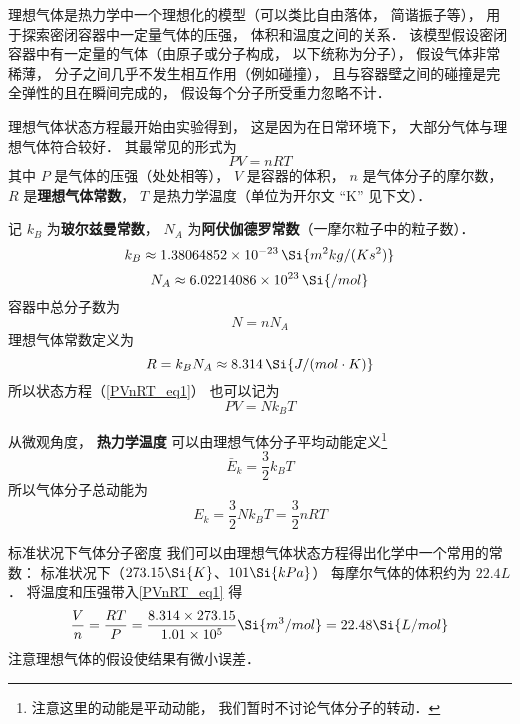 

理想气体是热力学中一个理想化的模型（可以类比自由落体， 简谐振子等）， 用于探索密闭容器中一定量气体的压强， 体积和温度之间的关系． 该模型假设密闭容器中有一定量的气体（由原子或分子构成， 以下统称为分子）， 假设气体非常稀薄， 分子之间几乎不发生相互作用（例如碰撞）， 且与容器壁之间的碰撞是完全弹性的且在瞬间完成的， 假设每个分子所受重力忽略不计．

理想气体状态方程最开始由实验得到， 这是因为在日常环境下， 大部分气体与理想气体符合较好． 其最常见的形式为
\begin{equation}\label{PVnRT_eq1}
PV = nRT
\end{equation}
其中 $P$ 是气体的压强（处处相等）， $V$ 是容器的体积， $n$ 是气体分子的摩尔数， $R$ 是\textbf{理想气体常数}， $T$ 是热力学温度（单位为开尔文 “K” 见下文）．

记 $k_B$ 为\textbf{玻尔兹曼常数}， $N_A$ 为\textbf{阿伏伽德罗常数}（一摩尔粒子中的粒子数）．
\begin{equation}
k_B \approx 1.38064852 \times 10^{-23} \,\Si{m^2 kg / (K s^2)}
\end{equation}
\begin{equation}
N_A \approx 6.02214086 \times 10^{23} \,\Si{/mol}
\end{equation}
容器中总分子数为
\begin{equation}
N = n N_A
\end{equation}
理想气体常数定义为
\begin{equation}\label{PVnRT_eq2}
R = k_B N_A \approx 8.314 \,\Si{J / (mol \cdot K)}
\end{equation}
所以状态方程（\autoref{PVnRT_eq1}） 也可以记为
\begin{equation}\label{PVnRT_eq4}
PV = N k_B T
\end{equation}

从微观角度， \textbf{热力学温度} 可以由理想气体分子平均动能定义\footnote{注意这里的动能是平动动能， 我们暂时不讨论气体分子的转动．}
\begin{equation}\label{PVnRT_eq3}
\bar E_k = \frac32 k_B T
\end{equation}
所以气体分子总动能为
\begin{equation}\label{PVnRT_eq5}
E_k = \frac32 Nk_B T = \frac{3}{2}nRT
\end{equation}

\begin{example}{标准状况下气体分子密度}
我们可以由理想气体状态方程得出化学中一个常用的常数： 标准状况下（$273.15 \Si{K}$、$101 \Si{kPa}$） 每摩尔气体的体积约为 $22.4L$． 将温度和压强带入\autoref{PVnRT_eq1} 得
\begin{equation}
\frac{V}{n} = \frac{RT}{P} = \frac{8.314 \times 273.15}{1.01\times 10^5}\Si{m^3/mol} = 22.48 \Si{L/mol}
\end{equation}
注意理想气体的假设使结果有微小误差．
\end{example}

